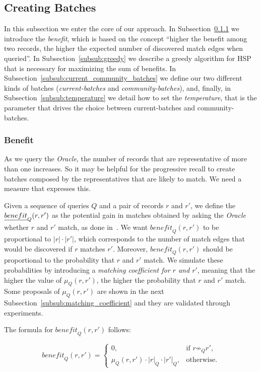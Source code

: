 \documentclass[sigconf, nonacm]{acmart}
\newcommand{\oracle}{\textit{Oracle}\xspace}
\newcommand{\benefit}{\textit{benefit}\xspace}
\begin{document}
\subsection{Creating Batches}

In this subsection we enter the core of our approach. In Subsection~\ref{subsub:benefit} we introduce the \emph{benefit}, which is based on the concept ``higher the benefit among two records, the higher the expected number of discovered match edges when queried''. In Subsection~\ref{subsub:greedy} we describe a greedy algorithm for HSP that is necessary for maximizing the sum of benefits. In Subsection~\ref{subsub:current_community_batches} we define our two different kinds of batches (\emph{current-batches} and \emph{community-batches}), and, finally, in Subsection~\ref{subsub:temperature} we detail how to set the \emph{temperature}, that is the parameter that drives the choice between current-batches and community-batches.

\subsubsection{Benefit}\label{subsub:benefit}

As we query the \oracle, the number of records that are representative of more than one increases. So it may be helpful for the progressive recall to create batches composed by the representatives that are likely to match. We need a measure that expresses this.

Given a sequence of queries $Q$ and a pair of records $r$ and $r'$, we define the $\emph{benefit}_Q(r,r')$ as the potential gain in matches obtained by asking the \oracle whether $r$ and $r'$ match, as done in~\cite{firmani2016online}. We want $\benefit_Q(r,r')$ to be proportional to $|r|\cdot|r'|$, which corresponds to the number of match edges that would be discovered if $r$ matches $r'$. Moreover, $\benefit_Q(r,r')$ should be proportional to the probability that $r$ and $r'$ match. We simulate these probabilities by introducing a \emph{matching coefficient for $r$ and $r'$}, meaning that the higher the value of $\mu_Q(r,r')$, the higher the probability that $r$ and $r'$ match. Some proposals of $\mu_Q(r,r')$ are shown in the next Subsection~\ref{subsub:matching_coefficient} and they are validated through experiments.

The formula for $\benefit_Q(r,r')$ follows:

\begin{equation}\label{eq:benefit}
    \benefit_Q(r,r') =
    \begin{cases}
        0, & \text{if } r\not\sim_Q r',\\
        \mu_Q(r,r') \cdot |r|_Q\cdot |r'|_Q, &\text{otherwise.}
    \end{cases}
\end{equation}
\end{document}
